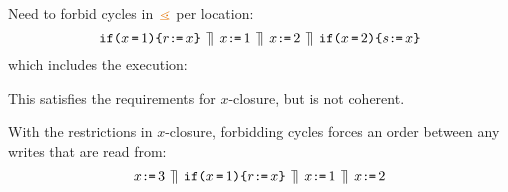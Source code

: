 Need to forbid cycles in $\gtN$ per location:
\[
  \IF{x\EQ1}\THEN r\GETS x \FI
  \PAR
  x\GETS 1
  \PAR
  x\GETS2
  \PAR
  \IF{x\EQ2}\THEN s\GETS x \FI
\]
which includes the execution:
\begin{tikzdisplay}[node distance=1em]
\end{tikzdisplay}
This satisfies the requirements for $x$-closure, but is not coherent.

With the restrictions in $x$-closure, forbidding cycles forces an order
between any writes that are read from:
\[
  x\GETS 3
  \PAR
  \IF{x\EQ1}\THEN r\GETS x \FI
  \PAR
  x\GETS 1
  \PAR
  x\GETS2
\]
\begin{tikzdisplay}[node distance=1em]
\end{tikzdisplay}


